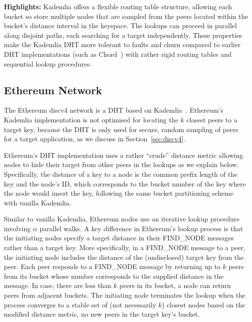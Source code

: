 \textbf{Highlights:} Kademlia offers a flexible routing table structure, allowing each bucket so store multiple nodes that are sampled from the peers located within the bucket's distance interval in the keyspace. The lookups can proceed in parallel along disjoint paths, each searching for a target independently. These properties make the Kademlia DHT more tolerant to faults and churn compared to earlier DHT implementations (such as Chord~\cite{chord}) with rather rigid routing tables and sequential lookup procedures.

\subsection{Ethereum Network}
\label{sec:eth-net}

The Ethereum discv4 network is a DHT based on Kademlia~\cite{maymounkov2002kademlia}. Ethereum's Kademlia implementation is not optimised for locating the $k$ closest peers to a target key, because the DHT is only used for secure, random sampling of peers for a target application, as we discuss in Section~\ref{sec:discv4}.  %

Ethereum's DHT implementation uses a rather ``crude'' distance metric allowing nodes to hide their target from other peers in the lookups as we explain below. Specifically, the distance of a key to a node is the common prefix length of the key and the node's ID, which corresponds to the bucket number of the key where the node would insert the key, following the same bucket partitioning scheme with vanilla Kademlia.

Similar to vanilla Kademlia, Ethereum nodes use an iterative lookup procedure involving $\alpha$ parallel walks. A key difference in Ethereum's lookup process is that the initiating nodes specify a target distance in their FIND\_NODE messages rather than a target key. More specifically, in a FIND\_NODE message to a peer, the initiating node includes the distance of the (undisclosed) target key from the peer. Each peer responds to a FIND\_NODE message by returning up to $k$ peers from its bucket whose number corresponds to the supplied distance in the message. In case, there are less than $k$ peers in its bucket, a node can return peers from adjacent buckets. The initiating node terminates the lookup when the process converges to a stable set of (not necessarily $k$) closest nodes based on the modified distance metric, \ie no new peers in the target key's bucket.


